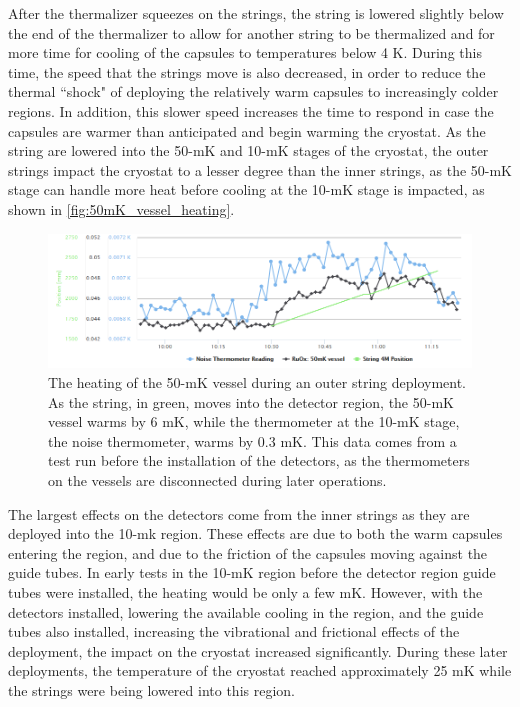 After the thermalizer squeezes on the strings, the string is lowered slightly below the end of the thermalizer to allow for another string to be thermalized and for more time for cooling of the capsules to temperatures below 4 K.
During this time, the speed that the strings move is also decreased, in order to reduce the thermal ``shock" of deploying the relatively warm capsules to increasingly colder regions.
In addition, this slower speed increases the time to respond in case the capsules are warmer than anticipated and begin warming the cryostat.
As the string are lowered into the 50-mK and 10-mK stages of the cryostat, the outer strings impact the cryostat to a lesser degree than the inner strings, as the 50-mK stage can handle more heat before cooling at the 10-mK stage is impacted, as shown in \autoref{fig:50mK_vessel_heating}.
\begin{figure}
    \centering
    \includegraphics[width=0.8\linewidth]{Figures/OuterStringHeating.png}
    \caption[The heating of the 50-mK vessel during an outer string deployment]
    {The heating of the 50-mK vessel during an outer string deployment.
    As the string, in green, moves into the detector region, the 50-mK vessel warms by 6 mK, while the thermometer at the 10-mK stage, the noise thermometer, warms by 0.3 mK.
    This data comes from a test run before the installation of the detectors, as the thermometers on the vessels are disconnected during later operations.}
    \label{fig:50mK_vessel_heating}
\end{figure}
The largest effects on the detectors come from the inner strings as they are deployed into the 10-mk region.
These effects are due to both the warm capsules entering the region, and due to the friction of the capsules moving against the guide tubes.
In early tests in the 10-mK region before the detector region guide tubes were installed, the heating would be only a few mK.
However, with the detectors installed, lowering the available cooling in the region, and the guide tubes also installed, increasing the vibrational and frictional effects of the deployment, the impact on the cryostat increased significantly.
During these later deployments, the temperature of the cryostat reached approximately 25 mK while the strings were being lowered into this region.
